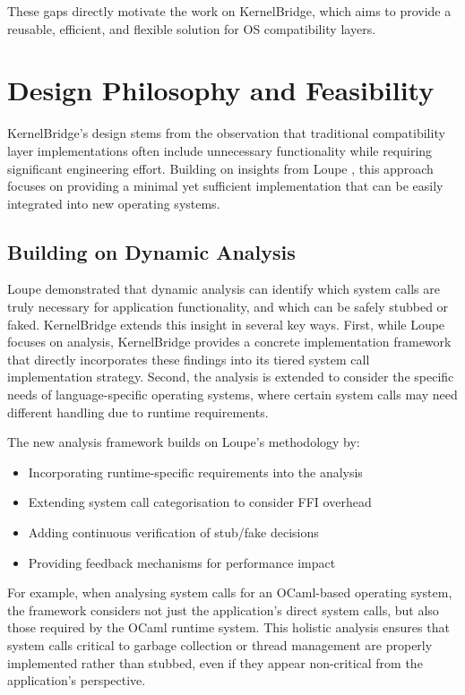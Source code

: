 \documentclass[conference]{IEEEtran}
\begin{document}
These gaps directly motivate the work on KernelBridge, which aims to provide a reusable, efficient, and flexible solution for OS compatibility layers.

\section{Design Philosophy and Feasibility}

KernelBridge's design stems from the observation that traditional compatibility layer
implementations often include unnecessary functionality while requiring significant engineering
effort. Building on insights from Loupe \cite{lefeuvre2024loupe}, this approach focuses on providing a minimal yet sufficient implementation that can be easily integrated into new operating systems.

\subsection{Building on Dynamic Analysis}

Loupe demonstrated that dynamic analysis can identify which system calls are truly necessary for
application functionality, and which can be safely stubbed or faked. KernelBridge extends this
insight in several key ways. First, while Loupe focuses on analysis, KernelBridge provides a
concrete implementation framework that directly incorporates these findings into its tiered system
call implementation strategy. Second, the analysis is extended to consider the specific needs of language-specific operating systems, where certain system calls may need different handling due to runtime requirements.

The new analysis framework builds on Loupe's methodology by:
\begin{itemize}
	\item Incorporating runtime-specific requirements into the analysis
	\item Extending system call categorisation to consider FFI overhead
	\item Adding continuous verification of stub/fake decisions
	\item Providing feedback mechanisms for performance impact
\end{itemize}

For example, when analysing system calls for an OCaml-based operating system, the framework considers not just the application's direct system calls, but also those required by the OCaml runtime system. This holistic analysis ensures that system calls critical to garbage collection or thread management are properly implemented rather than stubbed, even if they appear non-critical from the application's perspective.
\end{document}
